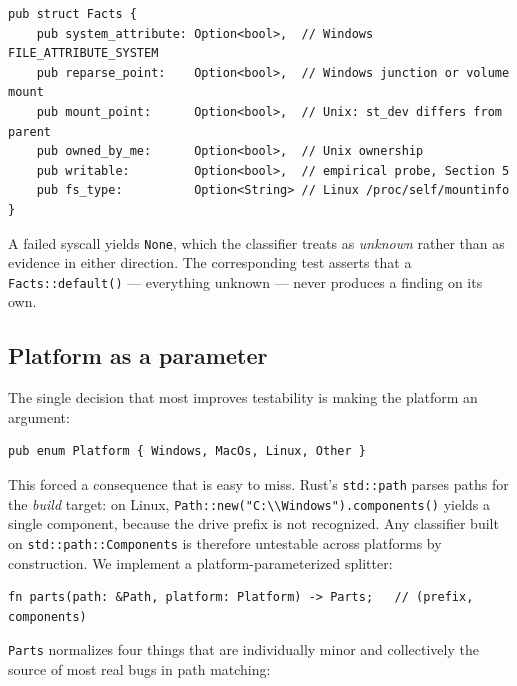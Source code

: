 \documentclass[11pt,a4paper]{article}
\newcommand{\code}[1]{\texttt{\small #1}}
\begin{document}
\begin{lstlisting}
pub struct Facts {
    pub system_attribute: Option<bool>,  // Windows FILE_ATTRIBUTE_SYSTEM
    pub reparse_point:    Option<bool>,  // Windows junction or volume mount
    pub mount_point:      Option<bool>,  // Unix: st_dev differs from parent
    pub owned_by_me:      Option<bool>,  // Unix ownership
    pub writable:         Option<bool>,  // empirical probe, Section 5
    pub fs_type:          Option<String> // Linux /proc/self/mountinfo
}
\end{lstlisting}

A failed syscall yields \code{None}, which the classifier treats as \emph{unknown}
rather than as evidence in either direction. The corresponding test asserts that a
\code{Facts::default()} --- everything unknown --- never produces a finding on its own.

\subsection{Platform as a parameter}

The single decision that most improves testability is making the platform an
argument:

\begin{lstlisting}
pub enum Platform { Windows, MacOs, Linux, Other }
\end{lstlisting}

This forced a consequence that is easy to miss. Rust's \code{std::path} parses paths
for the \emph{build} target: on Linux, \code{Path::new("C:\textbackslash\textbackslash Windows").components()}
yields a single component, because the drive prefix is not recognized. Any classifier
built on \code{std::path::Components} is therefore untestable across platforms by
construction. We implement a platform-parameterized splitter:

\begin{lstlisting}
fn parts(path: &Path, platform: Platform) -> Parts;   // (prefix, components)
\end{lstlisting}

\code{Parts} normalizes four things that are individually minor and collectively the
source of most real bugs in path matching:
\end{document}
